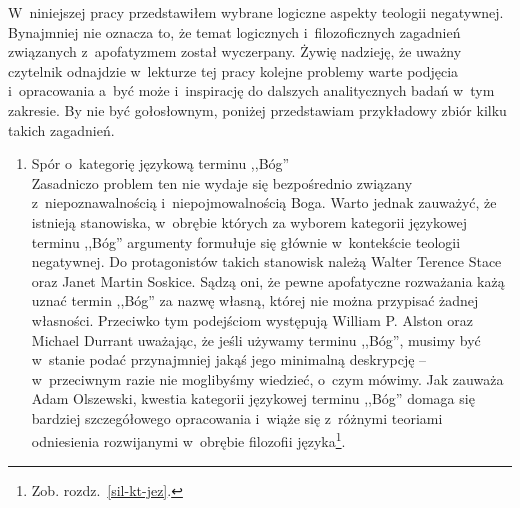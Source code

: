 W~niniejszej pracy przedstawiłem wybrane logiczne aspekty teologii negatywnej. Bynajmniej nie oznacza to, że temat logicznych i~filozoficznych zagadnień związanych z~apofatyzmem został wyczerpany. Żywię nadzieję, że uważny czytelnik odnajdzie w~lekturze tej pracy kolejne problemy warte podjęcia i~opracowania a~być może i~inspirację do dalszych analitycznych badań w~tym zakresie. By nie być gołosłownym, poniżej przedstawiam przykładowy zbiór kilku takich zagadnień.

\begin{enumerate}[label = \arabic*), itemindent=6mm, labelwidth=4mm, labelsep=2mm, itemsep=1em, leftmargin=0mm]
\item Spór o~kategorię językową terminu ,,Bóg''\\
Zasadniczo problem ten nie wydaje się bezpośrednio związany z~niepoznawalnością i~niepojmowalnością Boga. Warto jednak zauważyć, że istnieją stanowiska, w~obrębie których za wyborem kategorii językowej terminu ,,Bóg'' argumenty formułuje się głównie w~kontekście teologii negatywnej. Do protagonistów takich stanowisk należą Walter Terence Stace oraz Janet Martin Soskice. Sądzą oni, że pewne apofatyczne rozważania każą uznać termin ,,Bóg'' za nazwę własną, której nie można przypisać żadnej własności. Przeciwko tym podejściom występują William P. Alston oraz Michael Durrant uważając, że jeśli używamy terminu ,,Bóg'', musimy być w~stanie podać przynajmniej jakąś jego minimalną deskrypcję -- w~przeciwnym razie nie moglibyśmy wiedzieć, o~czym mówimy. Jak zauważa Adam Olszewski, kwestia kategorii językowej terminu ,,Bóg'' domaga się bardziej szczegółowego opracowania i~wiąże się z~różnymi teoriami odniesienia rozwijanymi w~obrębie filozofii języka\footnote{Zob. rozdz.~\ref{sil-kt-jez}.}.


\end{enumerate}
